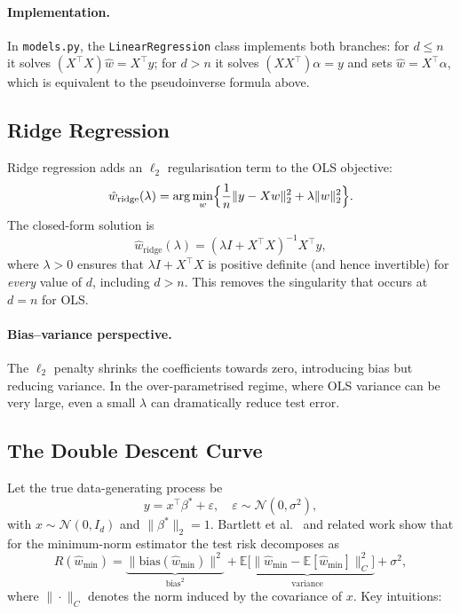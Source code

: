 \documentclass[11pt,a4paper]{article}
\begin{document}
\paragraph{Implementation.}
In \texttt{models.py}, the \texttt{LinearRegression} class implements both branches:
for $d \le n$ it solves $(X^\top X)\hat{w} = X^\top y$; for $d > n$ it solves
$(XX^\top)\alpha = y$ and sets $\hat{w} = X^\top \alpha$, which is equivalent to the
pseudoinverse formula above.

\subsection{Ridge Regression}

Ridge regression adds an $\ell_2$ regularisation term to the OLS objective:
\[
  \hat{w}_{\mathrm{ridge}}(\lambda) = \arg\min_{w}\Bigl\{\frac{1}{n}\|y - Xw\|_2^2 + \lambda\|w\|_2^2\Bigr\}.
\]
The closed-form solution is
\[
  \hat{w}_{\mathrm{ridge}}(\lambda) = (\lambda I + X^\top X)^{-1} X^\top y,
\]
where $\lambda > 0$ ensures that $\lambda I + X^\top X$ is positive definite (and hence
invertible) for \emph{every} value of $d$, including $d > n$.
This removes the singularity that occurs at $d = n$ for OLS.

\paragraph{Bias--variance perspective.}
The $\ell_2$ penalty shrinks the coefficients towards zero, introducing bias but reducing
variance.
In the over-parametrised regime, where OLS variance can be very large, even a small $\lambda$
can dramatically reduce test error.

\subsection{The Double Descent Curve}

Let the true data-generating process be
\[
  y = x^\top \beta^* + \varepsilon, \quad \varepsilon \sim \mathcal{N}(0, \sigma^2),
\]
with $x \sim \mathcal{N}(0, I_d)$ and $\|\beta^*\|_2 = 1$.
Bartlett et al.\ \cite{bartlett2020benign} and related work show that for the minimum-norm
estimator the test risk decomposes as
\[
  R(\hat{w}_{\mathrm{min}}) = \underbrace{\|\mathrm{bias}(\hat{w}_{\mathrm{min}})\|^2}_{\text{bias}^2}
    + \underbrace{\mathbb{E}\bigl[\|\hat{w}_{\mathrm{min}} - \mathbb{E}[\hat{w}_{\mathrm{min}}]\|_{C}^2\bigr]}_{\text{variance}}
    + \sigma^2,
\]
where $\|\cdot\|_C$ denotes the norm induced by the covariance of $x$.
Key intuitions:
\end{document}
